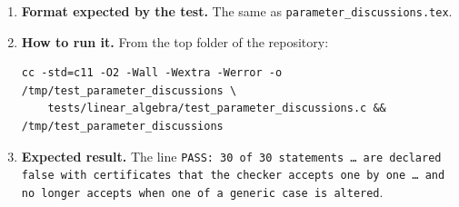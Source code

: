 \documentclass[11pt,a4paper]{article}
\begin{document}
\begin{enumerate}
\item \textbf{Format expected by the test.} The same as \texttt{parameter\_discussions.tex}.

\item \textbf{How to run it.} From the top folder of the repository:
\begin{verbatim}
cc -std=c11 -O2 -Wall -Wextra -Werror -o /tmp/test_parameter_discussions \
    tests/linear_algebra/test_parameter_discussions.c && /tmp/test_parameter_discussions
\end{verbatim}

\item \textbf{Expected result.} The line \texttt{PASS: 30 of 30 statements \dots{} are declared false with certificates that the checker accepts one by one \dots{} and no longer accepts when one of a generic case is altered}.
\end{enumerate}
\end{document}
